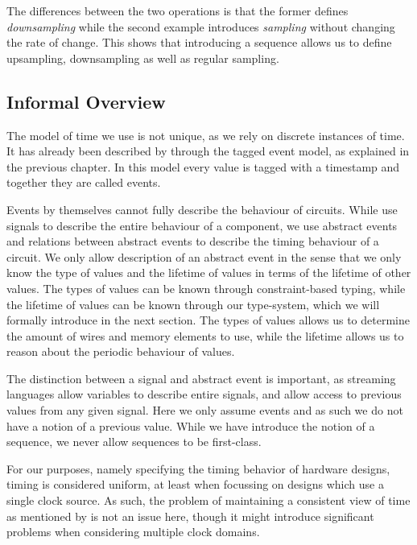 The differences between the two operations is that the former defines \textit{downsampling} while the second example introduces \textit{sampling} without changing the rate of change.
This shows that introducing a sequence allows us to define upsampling, downsampling as well as regular sampling.

\FloatBarrier
\subsection{Informal Overview}
The model of time we use is not unique, as we rely on discrete instances of time.
It has already been described by \citeauthor{lee1998framework} through the tagged event model, as explained in the previous chapter.
In this model every value is tagged with a timestamp and together they are called events.

Events by themselves cannot fully describe the behaviour of circuits.
While \citeauthor{lee1998framework} use signals to describe the entire behaviour of a component, we use abstract events and relations between abstract events to describe the timing behaviour of a circuit.
We only allow description of an abstract event in the sense that we only know the type of values and the lifetime of values in terms of the lifetime of other values.
The types of values can be known through constraint-based typing, while the lifetime of values can be known through our type-system, which we will formally introduce in the next section.
The types of values allows us to determine the amount of wires and memory elements to use, while the lifetime allows us to reason about the periodic behaviour of values.

The distinction between a signal and abstract event is important, as streaming languages allow variables to describe entire signals, and allow access to previous values from any given signal.
Here we only assume events and as such we do not have a notion of a previous value. 
While we have introduce the notion of a sequence, we never allow sequences to be first-class.

For our purposes, namely specifying the timing behavior of hardware designs, timing is considered uniform, at least when focussing on designs which use a single clock source.
As such, the problem of maintaining a consistent view of time as mentioned by \citeauthor{lee1998framework} is not an issue here, though it might introduce significant problems when considering multiple clock domains.

